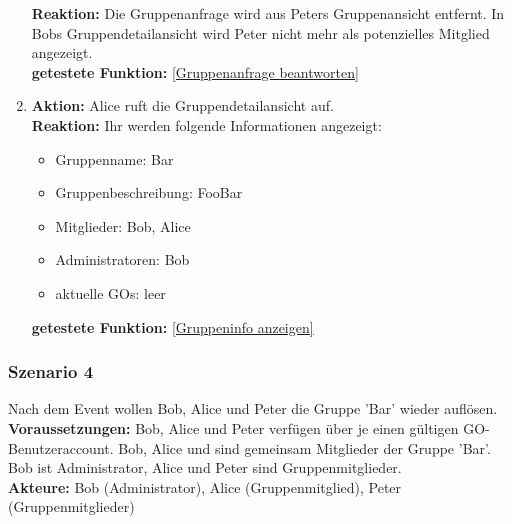 \documentclass[parskip=full]{scrartcl}
\def\threedigits#1{%
  \ifnum#1<100 0\fi
  \ifnum#1<10 0\fi
  \number#1}
\begin{document}
\begin{enumerate}[label={\textbf{/T\protect\threedigits{\theenumi}0/}}, leftmargin=*, resume]
	\textbf{Reaktion:} Die Gruppenanfrage wird aus Peters Gruppenansicht entfernt. In Bobs Gruppendetailansicht wird Peter nicht mehr als potenzielles Mitglied angezeigt.\\
	\textbf{getestete Funktion: }\ref{Gruppenanfrage beantworten}
	\item \textbf{Aktion:} Alice ruft die Gruppendetailansicht auf.\\
	\textbf{Reaktion:} Ihr werden folgende Informationen angezeigt:
	\begin{itemize}
		\item Gruppenname: Bar
		\item Gruppenbeschreibung: FooBar
		\item Mitglieder: Bob, Alice
		\item Administratoren: Bob
		\item aktuelle GOs: leer
	\end{itemize}
	\textbf{getestete Funktion: }\ref{Gruppeninfo anzeigen}
\end{enumerate}

\subsubsection*{Szenario 4}Nach dem Event wollen Bob, Alice und Peter die Gruppe 'Bar' wieder auflösen.\\

\textbf{Voraussetzungen: }Bob, Alice und Peter verfügen über je einen gültigen GO-Benutzeraccount. Bob, Alice und sind gemeinsam Mitglieder der Gruppe 'Bar'. Bob ist Administrator, Alice und Peter sind Gruppenmitglieder.\\

\textbf{Akteure:} Bob (Administrator), Alice (Gruppenmitglied), Peter (Gruppenmitglieder) \\
\end{document}
